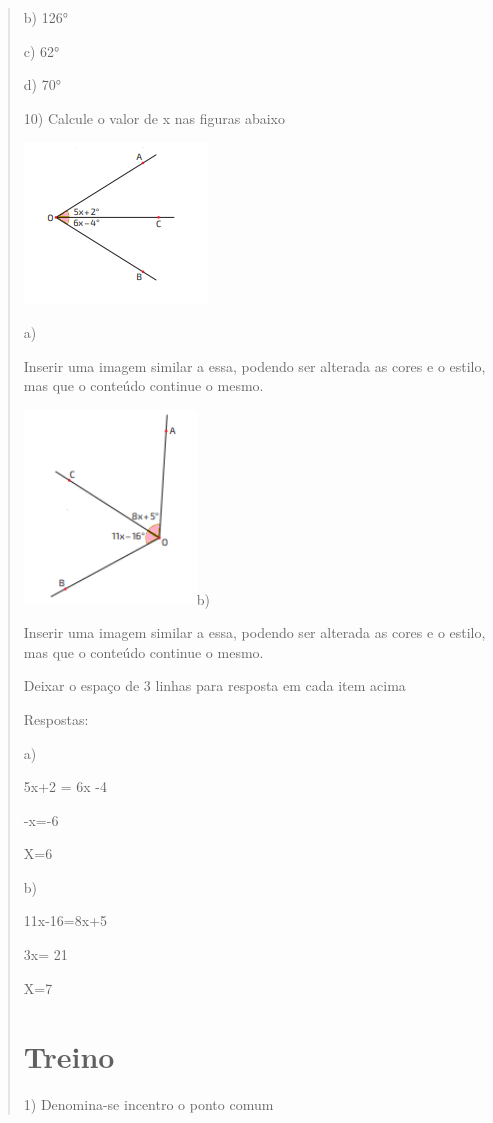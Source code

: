 \begin{quote}
\begin{escolha}
b) 126°

c) 62°

d) 70°

10) Calcule o valor de x nas figuras abaixo

\includegraphics[width=1.91667in,height=1.6875in]{./imgSAEB_8_MAT/media/image33.png}

a)

Inserir uma imagem similar a essa, podendo ser alterada as cores e o
estilo, mas que o conteúdo continue o mesmo.

\includegraphics[width=1.80208in,height=2.02917in]{./imgSAEB_8_MAT/media/image34.png}b)

Inserir uma imagem similar a essa, podendo ser alterada as cores e o
estilo, mas que o conteúdo continue o mesmo.

Deixar o espaço de 3 linhas para resposta em cada item acima

Respostas:

a)

5x+2 = 6x -4

-x=-6

X=6

b)

11x-16=8x+5

3x= 21

X=7

\section{Treino}

1) Denomina-se incentro o ponto comum


\end{escolha}
\end{quote}
